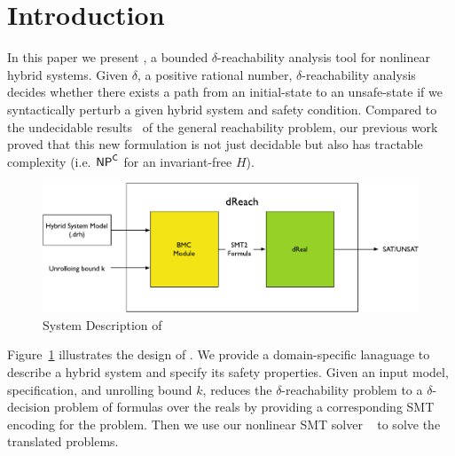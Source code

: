 \section{Introduction}


In this paper we present \dReach{}, a bounded $\delta$-reachability
analysis tool for nonlinear hybrid systems. Given $\delta$, a positive
rational number, $\delta$-reachability analysis decides whether there
exists a path from an initial-state to an unsafe-state if we
syntactically perturb a given hybrid system and safety condition.
Compared to the undecidable results~\cite{?} of the general
reachability problem, our previous
work~\cite{DBLP:journals/corr/GaoKCC14} proved that this new
formulation is not just decidable but also has tractable complexity
(i.e. $\mathsf{NP}^{\mathsf{C}}$ for an invariant-free $H$).

\begin{figure}
  \centering
  \includegraphics[width=\textwidth]{images/dReach}
  \caption{System Description of \dReach{}}
  \label{fig:system-description}
\end{figure}

Figure~\ref{fig:system-description} illustrates the design of
\dReach{}. We provide a domain-specific lanaguage to describe a hybrid
system and specify its safety properties. Given an input model,
specification, and unrolling bound $k$, \dReach{} reduces the
$\delta$-reachability problem to a $\delta$-decision problem of
formulas over the reals by providing a corresponding SMT encoding for
the problem. Then we use our nonlinear SMT solver
\dReal{}~\cite{DBLP:conf/cade/GaoKC13} to solve the translated problems.






